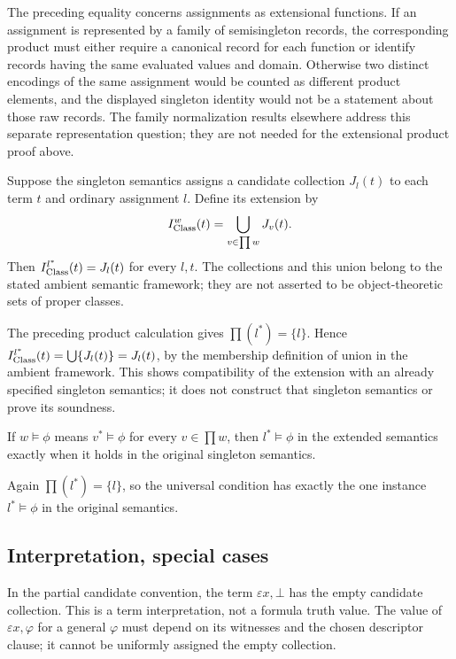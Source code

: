 \begin{note}
The preceding equality concerns assignments as extensional functions.
If an assignment is represented by a family of semisingleton records,
the corresponding product must either require a canonical record for
each function or identify records having the same evaluated values and
domain. Otherwise two distinct encodings of the same assignment would
be counted as different product elements, and the displayed singleton
identity would not be a statement about those raw records. The family
normalization results elsewhere address this separate representation
question; they are not needed for the extensional product proof above.
\end{note}

\begin{theorem}
Suppose the singleton semantics assigns a candidate collection $J_l(t)$
to each term $t$ and ordinary assignment $l$. Define its extension by
\[
I^w_{{\text{Class}}}(t)=\bigcup_{v\in\prod w}J_v(t).
\]
Then $I^{l^*}_{{\text{Class}}}(t)=J_l(t)$ for every $l,t$.
The collections and this union belong to the stated ambient semantic
framework; they are not asserted to be object-theoretic sets of proper classes.
\end{theorem}
\Proof
The preceding product calculation gives $\prod(l^*)=\{l\}$. Hence
$I^{l^*}_{{\text{Class}}}(t)=\bigcup\{J_l(t)\}=J_l(t)$, by the membership
definition of union in the ambient framework. This shows compatibility
of the extension with an already specified singleton semantics; it does
not construct that singleton semantics or prove its soundness.
\Done
\begin{theorem}
If $w\models\phi$ means $v^*\models\phi$ for every $v\in\prod w$,
then $l^*\models\phi$ in the extended semantics exactly when it holds
in the original singleton semantics.
\end{theorem}
\Proof
Again $\prod(l^*)=\{l\}$, so the universal condition has exactly the
one instance $l^*\models\phi$ in the original semantics.
\Done

\subsection{Interpretation, special cases}
In the partial candidate convention, the term $\varepsilon x,\bot$
has the empty candidate collection. This is a term interpretation, not a
formula truth value. The value of $\varepsilon x,\varphi$ for a general
$\varphi$ must depend on its witnesses and the chosen descriptor clause;
it cannot be uniformly assigned the empty collection.

